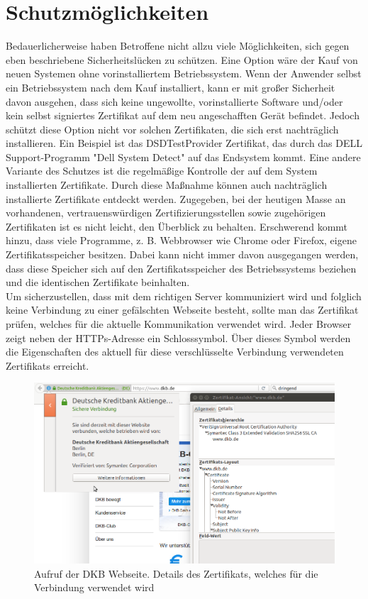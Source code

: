 \section{Schutzmöglichkeiten}
Bedauerlicherweise haben Betroffene nicht allzu viele Möglichkeiten, sich gegen eben beschriebene Sicherheitslücken zu schützen. 
Eine Option wäre der Kauf von neuen Systemen ohne vorinstalliertem Betriebssystem. Wenn der Anwender selbst ein Betriebssystem nach dem Kauf installiert, kann er mit großer Sicherheit davon ausgehen, dass sich keine ungewollte, vorinstallierte Software und/oder kein selbst signiertes Zertifikat auf dem neu angeschafften Gerät befindet. Jedoch schützt diese Option nicht vor solchen Zertifikaten, die sich erst nachträglich installieren. Ein Beispiel ist das DSDTestProvider Zertifikat, das durch das DELL Support-Programm "Dell System Detect" auf das Endsystem kommt. \cite[vgl.]{dell}
Eine andere Variante des Schutzes ist die regelmäßige Kontrolle der auf dem System installierten Zertifikate. Durch diese Maßnahme können auch nachträglich installierte Zertifikate entdeckt werden. Zugegeben, bei der heutigen Masse an vorhandenen, vertrauenswürdigen Zertifizierungsstellen sowie zugehörigen Zertifikaten ist es nicht leicht, den Überblick zu behalten. Erschwerend kommt hinzu, dass viele Programme, z. B. Webbrowser wie Chrome oder Firefox, eigene Zertifikatsspeicher besitzen. Dabei kann nicht immer davon ausgegangen werden, dass diese Speicher sich auf den Zertifikatsspeicher des Betriebssystems beziehen und die identischen Zertifikate beinhalten.\\
Um sicherzustellen, dass mit dem richtigen Server kommuniziert wird und folglich keine Verbindung zu einer gefälschten Webseite besteht, sollte man das Zertifikat prüfen, welches für die aktuelle Kommunikation verwendet wird. Jeder Browser zeigt neben der HTTPs-Adresse ein Schlosssymbol. Über dieses Symbol werden die Eigenschaften des aktuell für diese verschlüsselte Verbindung verwendeten Zertifikats erreicht. 
\begin{figure}[H]
	\centering
	\includegraphics[width=.7\linewidth]{images/ca_dkb.png}
	\caption{Aufruf der DKB Webseite. Details des Zertifikats, welches für die Verbindung verwendet wird}
\end{figure}
